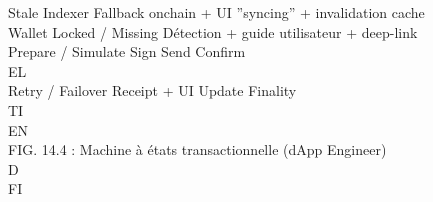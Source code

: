 Stale Indexer           Fallback onchain + UI ”syncing” + invalidation cache\\
Wallet Locked / Missing Détection + guide utilisateur + deep-link\\
\vspace{0.5em}
\vspace{0.5em}
\vspace{0.5em}
Prepare / Simulate         Sign          Send        Confirm\\
\vspace{0.5em}
\vspace{0.5em}
\vspace{0.5em}
\vspace{0.5em}
EL\\
Retry / Failover        Receipt + UI Update           Finality\\
\vspace{0.5em}
\vspace{0.5em}
\vspace{0.5em}
\vspace{0.5em}
TI\\
EN\\
FIG. 14.4 : Machine à états transactionnelle (dApp Engineer)\\
\vspace{0.5em}
\vspace{0.5em}
\vspace{0.5em}
\vspace{0.5em}
D\\
FI\\
